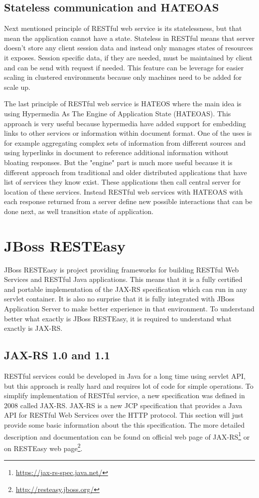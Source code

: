 \documentclass[12pt,final,oneside]{fithesis2}
\begin{document}
\subsection*{Stateless communication and HATEOAS}
Next mentioned principle of RESTful web service is its statelessness, but that mean the application cannot have a state. Stateless in RESTful means that server doesn't store any client session data and instead only manages states of resources it exposes. Session specific data, if they are needed, must be maintained by client and can be send with request if needed. This feature can be leverage for easier scaling in clustered environments because only machines need to be added for scale up. 

The last principle of RESTful web service is HATEOS where the main idea is using Hypermedia As The Engine of Application State (HATEOAS). This approach is very useful because hypermedia have added support for embedding links to other services or information within document format. One of the uses is for example aggregating complex sets of information from different sources and using hyperlinks in document to reference additional information without bloating responses. But the "engine" part is much more useful because it is different approach from traditional and older distributed applications that have list of services they know exist. These applications then call central server for location of these services. Instead RESTful web services with HATEOAS with each response returned from a server define new possible interactions that can be done next, as well transition state of application.

\section{JBoss RESTEasy}
JBoss RESTEasy is project providing frameworks for building RESTful Web Services and RESTful Java applications. This means that it is a fully certified and portable implementation of the JAX-RS specification which can run in any servlet container. It is also no surprise that it is fully integrated with JBoss Application Server to make better experience in that environment. To understand better what exactly is JBoss RESTEasy, it is required to understand what exactly is JAX-RS.\cite{resteasy-doc}

 
\subsection{JAX-RS 1.0 and 1.1}
RESTful services could be developed in Java for a long time using servlet API, but this approach is really hard and requires lot of code for simple operations. To simplify implementation of RESTful service, a new specification was defined in 2008 called JAX-RS. JAX-RS is a new JCP specification that provides a Java API for RESTful Web Services over the HTTP protocol. This section will just provide some basic information about the this specification. The more detailed description and documentation can be found on official web page of JAX-RS\footnote{\url{https://jax-rs-spec.java.net/}} or on RESTEasy web page\footnote{\url{http://resteasy.jboss.org/}}. 
\end{document}
